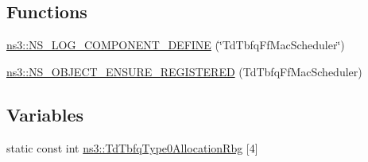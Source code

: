 \subsection*{Functions}
\begin{DoxyCompactItemize}
\item 
\hyperlink{namespacens3_a271416d0995f4310c0f28c075c9071b5}{ns3\+::\+N\+S\+\_\+\+L\+O\+G\+\_\+\+C\+O\+M\+P\+O\+N\+E\+N\+T\+\_\+\+D\+E\+F\+I\+NE} (\char`\"{}Td\+Tbfq\+Ff\+Mac\+Scheduler\char`\"{})
\item 
\hyperlink{namespacens3_a1dc8859ede832e95588038abe5fb1a5b}{ns3\+::\+N\+S\+\_\+\+O\+B\+J\+E\+C\+T\+\_\+\+E\+N\+S\+U\+R\+E\+\_\+\+R\+E\+G\+I\+S\+T\+E\+R\+ED} (Td\+Tbfq\+Ff\+Mac\+Scheduler)
\end{DoxyCompactItemize}
\subsection*{Variables}
\begin{DoxyCompactItemize}
\item 
static const int \hyperlink{namespacens3_a29a0b67f16d5c75422ba1321f5d03944}{ns3\+::\+Td\+Tbfq\+Type0\+Allocation\+Rbg} \mbox{[}4\mbox{]}
\end{DoxyCompactItemize}

